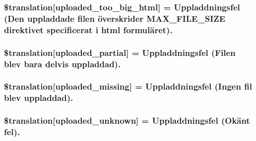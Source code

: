 \subsubsection[{\$translation}]{\setlength{\rightskip}{0pt plus 5cm}\$translation\mbox{[}\textquotesingle{}uploaded\+\_\+too\+\_\+big\+\_\+html\textquotesingle{}\mbox{]} = \textquotesingle{}Uppladdningsfel (Den uppladdade filen överskrider M\+A\+X\+\_\+\+F\+I\+L\+E\+\_\+\+S\+I\+Z\+E direktivet specificerat i html formuläret).\textquotesingle{}}\label{class_8upload_8sv___s_e_8php_a623d5b8b92169f57d7e43458aa911cbb}
\hypertarget{class_8upload_8sv___s_e_8php_a967c17da21b0a2d3bd65cca3a9ca0ea8}{}
\subsubsection[{\$translation}]{\setlength{\rightskip}{0pt plus 5cm}\$translation\mbox{[}\textquotesingle{}uploaded\+\_\+partial\textquotesingle{}\mbox{]} = \textquotesingle{}Uppladdningsfel (Filen blev bara delvis uppladdad).\textquotesingle{}}\label{class_8upload_8sv___s_e_8php_a967c17da21b0a2d3bd65cca3a9ca0ea8}
\hypertarget{class_8upload_8sv___s_e_8php_a0cce433260be65f1f35853a6b4b8952b}{}
\subsubsection[{\$translation}]{\setlength{\rightskip}{0pt plus 5cm}\$translation\mbox{[}\textquotesingle{}uploaded\+\_\+missing\textquotesingle{}\mbox{]} = \textquotesingle{}Uppladdningsfel (Ingen fil blev uppladdad).\textquotesingle{}}\label{class_8upload_8sv___s_e_8php_a0cce433260be65f1f35853a6b4b8952b}
\hypertarget{class_8upload_8sv___s_e_8php_a4a9168e922b827e6a28b5db1c00774ca}{}
\subsubsection[{\$translation}]{\setlength{\rightskip}{0pt plus 5cm}\$translation\mbox{[}\textquotesingle{}uploaded\+\_\+unknown\textquotesingle{}\mbox{]} = \textquotesingle{}Uppladdningsfel (Okänt fel).\textquotesingle{}}\label{class_8upload_8sv___s_e_8php_a4a9168e922b827e6a28b5db1c00774ca}
\hypertarget{class_8upload_8sv___s_e_8php_a3afc377bd803683314f413a814243066}{}
